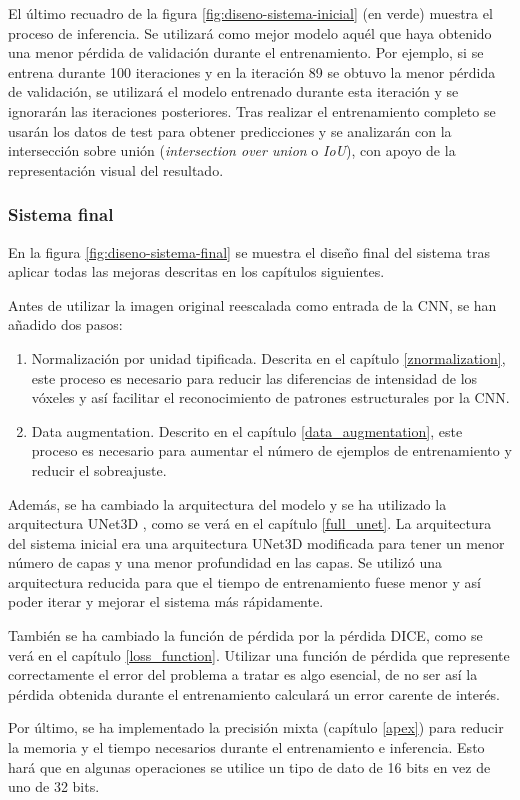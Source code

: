 El último recuadro de la figura \ref{fig:diseno-sistema-inicial} (en verde) muestra el proceso de inferencia. Se utilizará como mejor modelo aquél que haya obtenido una menor pérdida de validación durante el entrenamiento. Por ejemplo, si se entrena durante 100 iteraciones y en la iteración 89 se obtuvo la menor pérdida de validación, se utilizará el modelo entrenado durante esta iteración y se ignorarán las iteraciones posteriores. Tras realizar el entrenamiento completo se usarán los datos de test para obtener predicciones y se analizarán con la intersección sobre unión (\textit{intersection over union} o \textit{IoU}), con apoyo de la representación visual del resultado.

\subsubsection{Sistema final}

En la figura \ref{fig:diseno-sistema-final} se muestra el diseño final del sistema tras aplicar todas las mejoras descritas en los capítulos siguientes.

Antes de utilizar la imagen original reescalada como entrada de la CNN, se han añadido dos pasos:
\begin{enumerate}
\item Normalización por unidad tipificada. Descrita en el capítulo \ref{znormalization}, este proceso es necesario para reducir las diferencias de intensidad de los vóxeles y así facilitar el reconocimiento de patrones estructurales por la CNN. 
\item Data augmentation. Descrito en el capítulo \ref{data_augmentation}, este proceso es necesario para aumentar el número de ejemplos de entrenamiento y reducir el sobreajuste.
\end{enumerate}

Además, se ha cambiado la arquitectura del modelo y se ha utilizado la arquitectura UNet3D \cite{Falk2019}, como se verá en el capítulo \ref{full_unet}. La arquitectura del sistema inicial era una arquitectura UNet3D modificada para tener un menor número de capas y una menor profundidad en las capas. Se utilizó una arquitectura reducida para que el tiempo de entrenamiento fuese menor y así poder iterar y mejorar el sistema más rápidamente.

También se ha cambiado la función de pérdida por la pérdida DICE, como se verá en el capítulo \ref{loss_function}. Utilizar una función de pérdida que represente correctamente el error del problema a tratar es algo esencial, de no ser así la pérdida obtenida durante el entrenamiento calculará un error carente de interés.

Por último, se ha implementado la precisión mixta (capítulo \ref{apex}) para reducir la memoria y el tiempo necesarios durante el entrenamiento e inferencia. Esto hará que en algunas operaciones se utilice un tipo de dato de 16 bits en vez de uno de 32 bits.